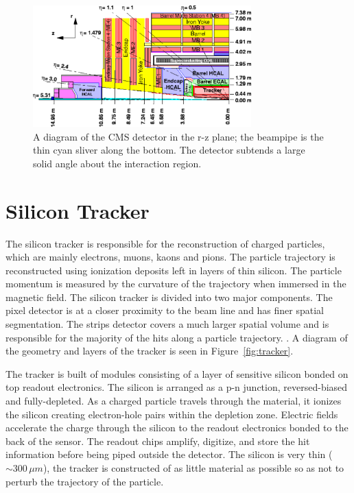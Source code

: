 \begin{figure}
\centering
\includegraphics[width=0.75\textwidth]{figs/img41.pdf}
\caption[A diagram of the CMS detector in the r-z plane.]{A diagram of the CMS detector in the r-z plane; the beampipe is the thin cyan sliver along the bottom. The detector subtends a large solid angle about the interaction region.}
\label{fig:detectoreta}
\end{figure}

\section{Silicon Tracker}

The silicon tracker is responsible for the reconstruction of charged particles, which are mainly electrons, muons, kaons and pions. The particle trajectory is reconstructed using ionization deposits left in layers of thin silicon. The particle momentum is measured by the curvature of the trajectory when immersed in the magnetic field. The silicon tracker is divided into two major components. The pixel detector is at a closer proximity to the beam line and has finer spatial segmentation. The strips detector covers a much larger spatial volume and is responsible for the majority of the hits along a particle trajectory. \cite{trackertdr, trackertdradd}. A diagram of the geometry and layers of the tracker is seen in Figure~\ref{fig:tracker}.

The tracker is built of modules consisting of a layer of sensitive silicon bonded on top readout electronics. The silicon is arranged as a p-n junction, reversed-biased and fully-depleted. As a charged particle travels through the material, it ionizes the silicon creating electron-hole pairs within the depletion zone. Electric fields accelerate the charge through the silicon to the readout electronics bonded to the back of the sensor. The readout chips amplify, digitize, and store the hit information before being piped outside the detector. The silicon is very thin ($\sim300\,\mu m$), the tracker is constructed of as little material as possible so as not to perturb the trajectory of the particle.

